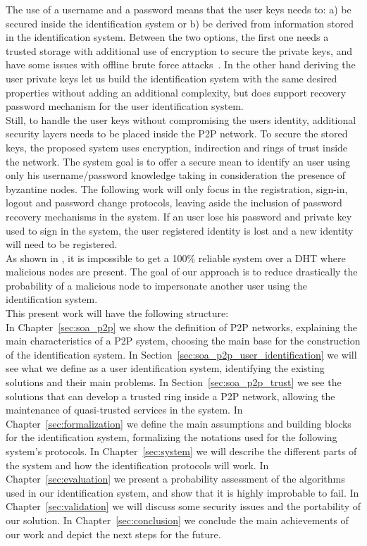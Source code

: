The use of a username and a password means that the user keys needs to: a) be
secured inside the identification system or b) be derived from information
stored in the identification system. Between  the two options, the first one
needs a trusted storage with additional use of encryption to secure the
private keys, and have some issues with offline brute force
attacks~\cite{kreitz2012passwords}. In the other hand deriving the user private
keys let us build the identification system with the same desired properties without adding an
additional complexity, but does support recovery password mechanism for the
user identification system.\\
Still, to handle the user keys without compromising the users identity, additional
security layers needs to be placed inside the P2P network.
To secure the stored keys, the proposed system uses encryption, indirection and
rings of trust inside the network. The system goal is to offer a secure mean to
identify an user using only his username/password knowledge taking in
consideration the presence of byzantine nodes. The following work will only
focus in the registration, sign-in, logout and password change protocols,
leaving aside the inclusion of password recovery mechanisms in the system. If
an user lose his password and private key used to sign in the system, the user
registered identity is lost and a new identity will need to be registered.\\

As shown in \cite{the_sybil_attack}, it is impossible to get a 100\% reliable
system over a DHT where malicious nodes are present. The goal of our approach
is to reduce drastically the probability of a malicious node to impersonate
another user using the identification system.\\


This present work will have the following structure:\\

In Chapter~\ref{sec:soa_p2p} we show the definition of P2P networks, explaining the
main characteristics of a P2P system, choosing the main base for the
construction of the identification system. In
Section~\ref{sec:soa_p2p_user_identification} we will see what we define as a
user identification system, identifying the existing solutions and their main
problems. In Section~\ref{sec:soa_p2p_trust} we see the solutions that can
develop a trusted ring inside a P2P network, allowing the maintenance of
quasi-trusted services in the system.  
In Chapter~\ref{sec:formalization} we define the main assumptions and building
blocks for the
identification system, formalizing the notations used for the following system's protocols.
In Chapter~\ref{sec:system}  we will describe the different parts of the system and how the
identification protocols will work.
In Chapter~\ref{sec:evaluation} we present a probability assessment of
the algorithms used in our identification system, and show that it is highly
improbable to fail.
In Chapter~\ref{sec:validation} we will discuss some security issues and the portability of our
solution.
In Chapter~\ref{sec:conclusion} we conclude the main achievements of our work
and depict the next steps for the future.
